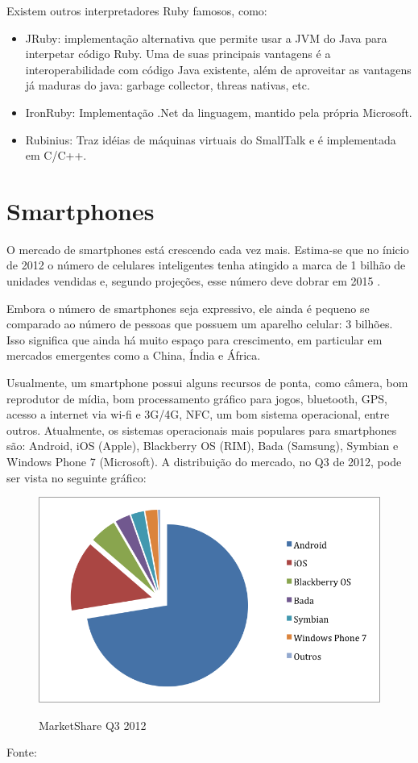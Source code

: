 	Existem outros interpretadores Ruby famosos, como:
 \begin{itemize}
 \item JRuby: implementação alternativa que permite usar a \ac{JVM} do Java para interpetar código Ruby. Uma de suas principais vantagens é a interoperabilidade com código Java existente, além de aproveitar as vantagens já maduras do java: garbage collector, threas nativas, etc.
 \item IronRuby: Implementação .Net da linguagem, mantido pela própria Microsoft.
 \item Rubinius: Traz idéias de máquinas virtuais do SmallTalk e é implementada em C/C++.
 \end{itemize}
 \section{Smartphones}

 	O mercado de smartphones está crescendo cada vez mais. Estima-se que no ínicio de 2012 o número de celulares inteligentes tenha atingido a marca de 1 bilhão de unidades vendidas e, segundo projeções, esse número deve dobrar em 2015 \cite{yahoosmart}. 
 	
	Embora o número de smartphones seja expressivo, ele ainda é pequeno se comparado ao número de pessoas que possuem um aparelho celular: 3 bilhões. Isso significa que ainda há muito espaço para crescimento, em particular em mercados emergentes como a China, Índia e África.
 	
	Usualmente, um smartphone possui alguns recursos de ponta, como câmera, bom reprodutor de mídia, bom processamento gráfico para jogos, bluetooth, GPS, acesso a internet via wi-fi e 3G/4G, \ac{NFC}, um bom sistema operacional, entre outros. 
 Atualmente, os sistemas operacionais mais populares para smartphones são: Android, iOS (Apple), Blackberry OS (RIM), Bada (Samsung), Symbian e Windows Phone 7 (Microsoft). A distribuição do mercado, no Q3 de 2012, pode ser vista no seguinte gráfico:
 \begin{figure}[H]
   \centering
   \includegraphics[width=0.8\linewidth]{figs/smartpizza.png}\\
   \caption{ MarketShare Q3 2012}
   \label{FIG:smartpizza}
 \end{figure}
 Fonte: \cite{neowin}
 
